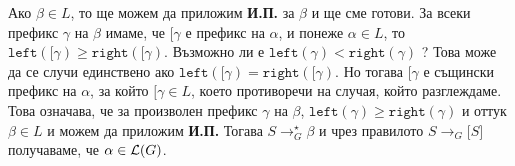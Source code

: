 \begin{hint}
\begin{itemize}
    Ако $\beta \in L$, то ще можем да приложим {\bf И.П.} за $\beta$ и ще сме готови.
    За всеки префикс $\gamma$ на $\beta$ имаме, че $\texttt{[}\gamma$ е префикс на $\alpha$,
    и понеже $\alpha \in L$, то $\texttt{left}(\texttt{[}\gamma) \geq \texttt{right}(\texttt{[}\gamma)$.
    Възможно ли е $\texttt{left}(\gamma) < \texttt{right}(\gamma)$ ?
    Това може да се случи единствено ако $\texttt{left}(\texttt{[}\gamma) = \texttt{right}(\texttt{[}\gamma)$.
    Но тогава $\texttt{[}\gamma$ е същински префикс на $\alpha$, за който $\texttt{[}\gamma \in L$,
    което противоречи на случая, който разглеждаме.
    Това означава, че за произволен префикс $\gamma$ на $\beta$,
    $\texttt{left}(\gamma) \geq \texttt{right}(\gamma)$ и оттук $\beta \in L$ и можем да приложим {\bf И.П.}
    Тогава $S \to^\star_G \beta$ и чрез правилото $S \to_G \texttt{[}S\texttt{]}$
    получаваме, че $\alpha \in \mathcal{L}(G)$.    
  \end{itemize}
\end{hint}

